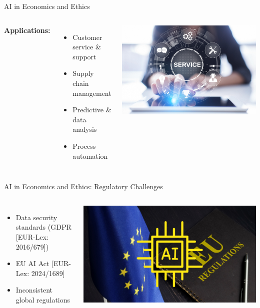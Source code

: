 \documentclass{beamer}
\begin{document}
\begin{frame}{AI in Economics and Ethics}
  \begin{columns}
      \textbf{Applications:}
      \begin{itemize}
        \item Customer service \& support
        \item Supply chain management
        \item Predictive \& data analysis
        \item Process automation
      \end{itemize}
      \centering
      \includegraphics[width=\textwidth]{Customer-Support.png}
  \end{columns}
\end{frame}

\begin{frame}{AI in Economics and Ethics: Regulatory Challenges}
  \begin{columns}
      \begin{itemize}
        \item Data security standards (GDPR [EUR-Lex: 2016/679])
        \item EU AI Act [EUR-Lex: 2024/1689]
        \item Inconsistent global regulations
      \end{itemize}
      \centering
      \includegraphics[width=\textwidth]{EU-AI-Regulation.png}
  \end{columns}
\end{frame}
\end{document}
